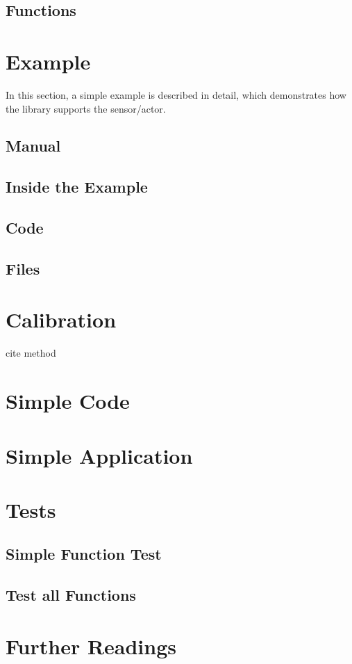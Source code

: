 \subsection{Functions}

\section{Example}

In this section, a simple example is described in detail, which demonstrates how the library supports the sensor/actor.


\subsection{Manual}

\subsection{Inside the Example}

\subsection{Code}

\subsection{Files}



\section{Calibration}

cite method

\section{Simple Code}


\section{Simple Application}



\section{Tests}

\subsection{Simple Function Test}

\subsection{Test all Functions}



\section{Further Readings}


